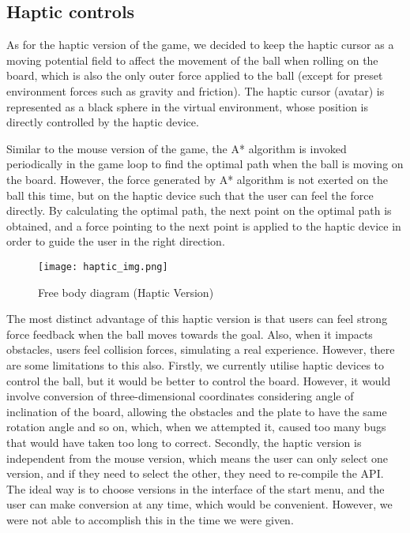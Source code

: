 \documentclass[a4paper]{article}
\begin{document}
\subsection{Haptic controls}
As for the haptic version of the game, we decided to keep the haptic cursor as a moving potential field to affect the movement of the ball when rolling on the board, which is also the only outer force applied to the ball (except for preset environment forces such as gravity and friction). The haptic cursor (avatar) is represented as a black sphere in the virtual environment, whose position is directly controlled by the haptic device.

Similar to the mouse version of the game, the A* algorithm is invoked periodically in the game loop to find the optimal path when the ball is moving on the board. However, the force generated by A* algorithm is not exerted on the ball this time, but on the haptic device such that the user can feel the force directly. By calculating the optimal path, the next point on the optimal path is obtained, and a force pointing to the next point is applied to the haptic device in order to guide the user in the right direction.

\begin{figure}[H]
    \centering
    \texttt{[image: haptic\_img.png]}
    \caption{Free body diagram (Haptic Version)}
    \label{fig:haptic_img}
\end{figure}

The most distinct advantage of this haptic version is that users can feel strong force feedback when the ball moves towards the goal. Also, when it impacts obstacles, users feel collision forces, simulating a real experience. However, there are some limitations to this also. Firstly, we currently utilise haptic devices to control the ball, but it would be better to control the board. However, it would involve conversion of three-dimensional coordinates considering angle of inclination of the board, allowing the obstacles and the plate to have the same rotation angle and so on, which, when we attempted it, caused too many bugs that would have taken too long to correct. Secondly, the haptic version is independent from the mouse version, which means the user can only select one version, and if they need to select the other, they need to re-compile the API. The ideal way is to choose versions in the interface of the start menu, and the user can make conversion at any time, which would be convenient. However, we were not able to accomplish this in the time we were given. 
\end{document}
